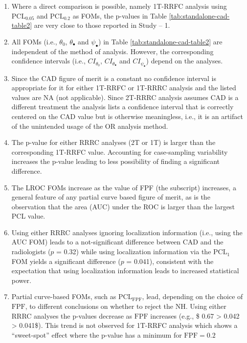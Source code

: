 \documentclass[
]{book}
\providecommand{\tightlist}{%
  \setlength{\itemsep}{0pt}\setlength{\parskip}{0pt}}
\begin{document}
\begin{enumerate}
\def\labelenumi{\arabic{enumi}.}
\tightlist
\item
  Where a direct comparison is possible, namely 1T-RRFC analysis using \(\text{PCL}_{0.05}\) and \(\text{PCL}_{0.2}\) as FOMs, the p-values in Table \ref{tab:standalone-cad-table2} are very close to those reported in Study -- 1.
\item
  All FOMs (i.e., \(\theta_0\), \(\theta_{\bullet}\) and \(\psi_{\bullet}\)) in Table \ref{tab:standalone-cad-table2} are independent of the method of analysis. However, the corresponding confidence intervals (i.e., \(CI_{\theta_0}\), \(CI_{\theta_{\bullet}}\) and \(CI_{\psi_{\bullet}}\)) depend on the analyses.
\item
  Since the CAD figure of merit is a constant no confidence interval is appropriate for it for either 1T-RRFC or 1T-RRRC analysis and the listed values are NA (not applicable). Since 2T-RRRC analysis assumes CAD is a different treatment the analysis lists a confidence interval that is correctly centered on the CAD value but is otherwise meaningless, i.e., it is an artifact of the unintended usage of the OR analysis method.
\item
  The p-value for either RRRC analyses (2T or 1T) is larger than the corresponding 1T-RRFC value. Accounting for case-sampling variability increases the p-value leading to less possibility of finding a significant difference.
\item
  The LROC FOMs increase as the value of FPF (the subscript) increases, a general feature of any partial curve based figure of merit, as is the observation that the area (AUC) under the ROC is larger than the largest PCL value.
\item
  Using either RRRC analyses ignoring localization information (i.e., using the AUC FOM) leads to a not-significant difference between CAD and the radiologists (\(p\) = 0.32) while using localization information via the \(\text{PCL}_1\) FOM yields a significant difference (\(p\) = 0.041), consistent with the expectation that using localization information leads to increased statistical power.
\item
  Partial curve-based FOMs, such as \(\text{PCL}_\text{FPF}\), lead, depending on the choice of \(\text{FPF}\), to different conclusions on whether to reject the NH. Using either RRRC analyses the p-values decrease as \(\text{FPF}\) increases (e.g., \$ 0.67 \textgreater{} 0.042 \textgreater{} 0.041\$). This trend is not observed for 1T-RRFC analysis which shows a ``sweet-spot'' effect where the p-value has a minimum for \(\text{FPF} = 0.2\)
\end{enumerate}
\end{document}
